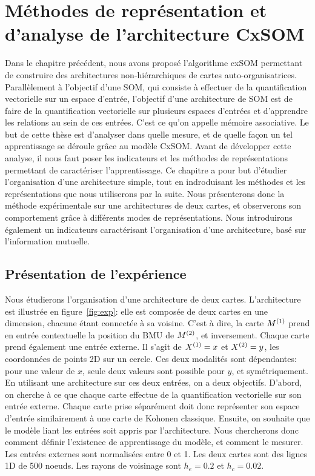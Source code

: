 \chapter{Méthodes de représentation et d'analyse de l'architecture CxSOM}
\graphicspath{{03-Representation/}}

\minitoc

Dans le chapitre précédent, nous avons proposé l'algorithme cxSOM permettant de construire des architectures non-hiérarchiques de cartes auto-organisatrices. Parallèlement à l'objectif d'une SOM, qui consiste à effectuer de la quantification vectorielle sur un espace d'entrée, l'objectif d'une architecture de SOM est de faire de la quantification vectorielle sur plusieurs espaces d'entrées et d'apprendre les relations au sein de ces entrées. C'est ce qu'on appelle mémoire associative. Le but de cette thèse est d'analyser dans quelle mesure, et de quelle façon un tel apprentissage se déroule grâce au modèle CxSOM. Avant de développer cette analyse, il nous faut poser les indicateurs et les méthodes de représentations permettant de caractériser l'apprentissage.
Ce chapitre a pour but d'étudier  l'organisation d'une architecture simple, tout en indroduisant les méthodes et les représentations que nous utiliserons par la suite. Nous présenterons donc la méthode expérimentale sur une architectures de deux cartes, et observerons son comportement grâce à différents modes de représentations. Nous introduirons également un indicateurs caractérisant l'organisation d'une architecture, basé sur l'information mutuelle.

\section{Présentation de l'expérience}

Nous étudierons l'organisation d'une architecture de deux cartes. L'architecture est illustrée en figure~\ref{fig:exp}: elle est composée de deux cartes en une dimension, chacune étant connectée à sa voisine. C'est à dire, la carte $M^{({1})}$ prend en entrée contextuelle la position du BMU de $M^{({2})}$, et inversement.
Chaque carte prend également une entrée externe. Il s'agit de $X^{({1})}=x$ et $X^{({2})}=y$, les coordonnées de points 2D sur un cercle. Ces deux modalités sont dépendantes: pour une valeur de $x$, seule deux valeurs sont possible pour $y$, et symétriquement.
En utilisant une architecture sur ces deux entrées, on a deux objectifs. D'abord, on cherche à ce que chaque carte effectue de la quantification vectorielle sur son entrée externe. Chaque carte prise séparément doit donc représenter son espace d'entrée similairement à une carte de Kohonen classique. Ensuite, on souhaite que le modèle liant les entrées soit appris par l'architecture. 
Nous chercherons donc comment définir l'existence de apprentissage du modèle, et comment le mesurer.
Les entrées externes sont normalisées entre 0 et 1. Les deux cartes sont des lignes 1D de 500 noeuds. Les rayons de voisinage sont $h_e = 0.2$ et $h_c = 0.02$. 

